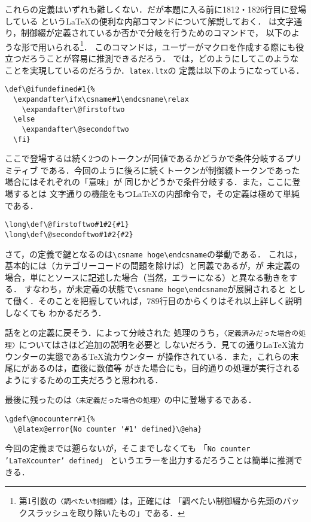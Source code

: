 \documentclass[autodetect-engine,dvipdfmx]{jsarticle}
\begin{document}
これらの定義はいずれも難しくない．だが本題に入る前に1812・1826行目に登場している
という\LaTeX の便利な内部コマンドについて解説しておく．
は文字通り，制御綴が定義されているか否かで分岐を行うためのコマンドで，
以下のような形で用いられる\footnote{第1引数の\texttt{〈調べたい制御綴〉}は，正確には
「調べたい制御綴から先頭のバックスラッシュを取り除いたもの」である．}．
このコマンドは，ユーザーがマクロを作成する際にも役立つだろうことが容易に推測できるだろう．
では，どのようにしてこのようなことを実現しているのだろうか．\texttt{latex.ltx}の
定義は以下のようになっている．
\begin{lstlisting}[firstnumber=788]
\def\@ifundefined#1{%
  \expandafter\ifx\csname#1\endcsname\relax
    \expandafter\@firstoftwo
  \else
    \expandafter\@secondoftwo
  \fi}
\end{lstlisting}
ここで登場するは続く2つのトークンが同値であるかどうかで条件分岐するプリミティブ
である．今回のように後ろに続くトークンが制御綴トークンであった場合にはそれぞれの「意味」が
同じかどうかで条件分岐する．また，ここに登場するとは
文字通りの機能をもつ\LaTeX の内部命令で，その定義は極めて単純である．
\begin{lstlisting}[firstnumber=105]
\long\def\@firstoftwo#1#2{#1}
\long\def\@secondoftwo#1#2{#2}
\end{lstlisting}

さて，の定義で鍵となるのは\verb|\csname hoge\endcsname|の挙動である．
これは，基本的には（カテゴリーコードの問題を除けば）と同義であるが，が
未定義の場合，単にとソースに記述した場合（当然，エラーになる）と異なる動きをする．
すなわち，が未定義の状態で\verb|\csname hoge\endcsname|が展開されると
として働く．そのことを把握していれば，789行目のからくりはそれ以上詳しく説明しなくても
わかるだろう．

話をとの定義に戻そう．によって分岐された
処理のうち，\texttt{〈定義済みだった場合の処理〉}についてはさほど追加の説明を必要と
しないだろう．見ての通り\LaTeX 流カウンターの実態である\TeX 流カウンター
が操作されている．また，これらの末尾にがあるのは，直後に数値等
がきた場合にも，目的通りの処理が実行されるようにするための工夫だろうと思われる．

最後に残ったのは\texttt{〈未定義だった場合の処理〉}の中に登場するである．
\begin{lstlisting}[firstnumber=1067]
\gdef\@nocounterr#1{%
  \@latex@error{No counter '#1' defined}\@eha}
\end{lstlisting}
今回の定義までは遡らないが，そこまでしなくても
「\texttt{No counter 'LaTeXcounter' defined}」\linebreak
というエラーを出力するだろうことは簡単に推測できる．
\end{document}
